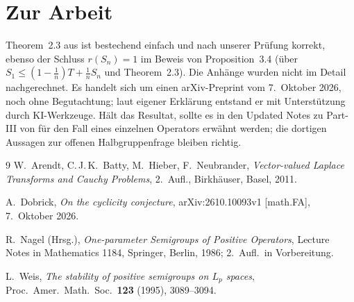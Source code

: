 \documentclass[11pt,a4paper]{article}
\theoremstyle{remark}
\theoremstyle{definition}
\begin{document}
\section{Zur Arbeit}

Theorem~2.3 aus \cite{dobrick} ist bestechend einfach und nach unserer Prüfung korrekt, ebenso der Schluss $r(S_n) = 1$ im Beweis von Proposition~3.4 (über $S_1 \le (1-\tfrac1n)T + \tfrac1n S_n$ und Theorem~2.3).
Die Anhänge wurden nicht im Detail nachgerechnet.
Es handelt sich um einen arXiv-Preprint vom 7.~Oktober 2026, noch ohne Begutachtung; laut eigener Erklärung entstand er mit Unterstützung durch KI-Werkzeuge.
Hält das Resultat, sollte es in den Updated Notes zu Part-III von \cite{ln} für den Fall eines einzelnen Operators erwähnt werden; die dortigen Aussagen zur offenen Halbgruppenfrage bleiben richtig.

\begin{thebibliography}{9}
W.~Arendt, C.\,J.\,K.~Batty, M.~Hieber, F.~Neubrander,
\emph{Vector-valued Laplace Transforms and Cauchy Problems},
2.~Aufl., Birkhäuser, Basel, 2011.

A.~Dobrick,
\emph{On the cyclicity conjecture},
arXiv:2610.10093v1 [math.FA], 7.~Oktober 2026.

R.~Nagel (Hrsg.),
\emph{One-parameter Semigroups of Positive Operators},
Lecture Notes in Mathematics 1184, Springer, Berlin, 1986; 2.~Aufl.\ in Vorbereitung.

L.~Weis,
\emph{The stability of positive semigroups on $L_p$ spaces},
Proc.\ Amer.\ Math.\ Soc.\ \textbf{123} (1995), 3089--3094.
\end{thebibliography}
\end{document}
